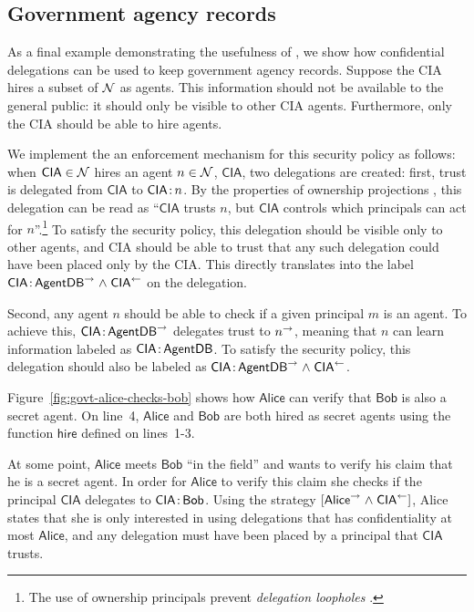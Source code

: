 \subsection{Government agency records}\label{subsec:agents}
As a final example demonstrating the usefulness of \lang, we show how confidential delegations can be used to keep government agency records. Suppose the CIA hires a subset of $\mathcal{N}$  as agents. 
This information should not be available to the general public: it should only be visible to other CIA agents. Furthermore, only the CIA should be able to hire agents.

We implement the an enforcement mechanism for this security policy as follows: when $\mathsf{CIA} \in \mathcal{N}$ hires an agent $n \in \mathcal{N}$, $\mathsf{CIA}$, two delegations are created: first, trust is delegated from $\mathsf{CIA}$ to $\mathsf{CIA} \colon \!n$. By the properties of ownership projections \cite{Arden:2015:FA:2859845.2859998}, this delegation can be read as ``$\mathsf{CIA}$ trusts $n$, but $\mathsf{CIA}$ controls which principals can act for $n$''.\footnote{The use of ownership principals prevent \emph{delegation loopholes} \cite{Arden:2015:FA:2859845.2859998}.} To satisfy the security policy, this delegation should be visible only to other agents, and CIA should be able to trust that any such delegation could have been placed only by the CIA. This directly translates into the label $\mathsf{CIA} \colon \!\mathsf{AgentDB}^{\rightarrow} \mathrel{\land} \mathsf{CIA}^{\leftarrow}$ on the delegation.

Second, any agent $n$ should be able to check if a given principal $m$ is an agent. To achieve this, $\mathsf{CIA} \colon \!\mathsf{AgentDB}^{\rightarrow}$ delegates trust to $n^{\rightarrow}$, meaning that $n$ can learn information labeled as $\mathsf{CIA} \colon \!\mathsf{AgentDB}$. To satisfy the security policy, this delegation should also be labeled as $\mathsf{CIA} \colon \!\mathsf{AgentDB}^{\rightarrow} \mathrel{\land} \mathsf{CIA}^{\leftarrow}$.

Figure~\ref{fig:govt-alice-checks-bob} shows how $\mathsf{Alice}$ can verify that $\mathsf{Bob}$ is also a secret agent. On line~4, $\mathsf{Alice}$ and $\mathsf{Bob}$ are both hired as secret agents using the function $\mathsf{hire}$ defined on lines~1-3. 

At some point, $\mathsf{Alice}$ meets $\mathsf{Bob}$ ``in the field'' and wants to verify his claim that he is a secret agent. In order for $\mathsf{Alice}$ to verify this claim she checks if the principal $\mathsf{CIA}$ delegates to $\mathsf{CIA} \colon \!\mathsf{Bob}$. Using the strategy $[\mathsf{Alice}^{\rightarrow} \mathrel{\land} \mathsf{CIA}^{\leftarrow}]$, Alice states that she is only interested in using delegations that has confidentiality at most $\mathsf{Alice}$, and any delegation must have been placed by a principal that $\mathsf{CIA}$ trusts.

